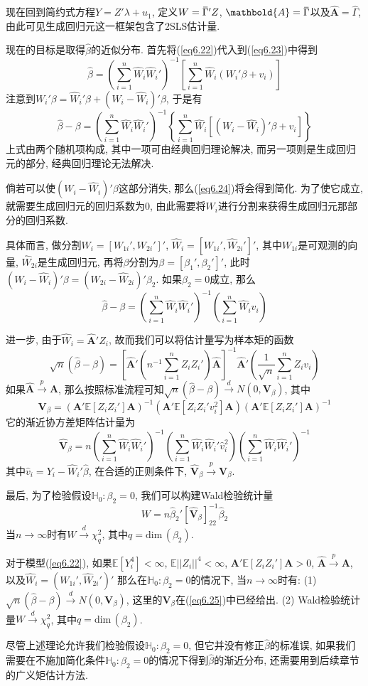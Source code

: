 \documentclass[cn, 12pt, math=mtpro2, bibstyle=apa, blue, twocol]{elegantbook}
\newcommand{\E}{\mathbb{E}}
\newcommand{\hb}{\hat{\beta}}
\newcommand{\HH}{\mathbb{H}}
\newcommand{\V}{\mathbold{V}}
\newcommand{\A}{\mathbold{A}}
\newcommand{\overbar}[1]{\mkern 1.5mu\overline{\mkern-1.5mu#1\mkern-1.5mu}\mkern 1.5mu}
\begin{document}
现在回到简约式方程$Y=Z'\lambda+u_1$, 定义$W=\overbar{\Gamma}'Z$, $\mathbold{A}=\overbar{\Gamma}$以及$\hat{\mathbold{A}}=\hat{\Gamma}$, 由此可见生成回归元这一框架包含了2SLS估计量.

现在的目标是取得$\hb$的近似分布. 首先将(\ref{eq6.22})代入到(\ref{eq6.23})中得到
$$\hb=\left(\sum_{i=1}^{n}\hat{W}_i\hat{W}_i'\right)^{-1}\left[\sum_{i=1}^{n}\hat{W}_i(W_i'\beta+v_i)\right]$$
注意到$W_i'\beta=\hat{W}_i'\beta+(W_i-\hat{W}_i)'\beta$, 于是有
\begin{equation}\label{eq6.24}
  \hb-\beta=\left(\sum_{i=1}^{n}\hat{W}_i\hat{W}_i'\right)^{-1}\left\{\sum_{i=1}^{n}\hat{W}_i\left[(W_i-\hat{W}_i)'\beta+v_i\right]\right\}
\end{equation}
上式由两个随机项构成, 其中一项可由经典回归理论解决, 而另一项则是生成回归元的部分, 经典回归理论无法解决.

倘若可以使$(W_i-\hat{W}_i)'\beta$这部分消失, 那么(\ref{eq6.24})将会得到简化. 为了使它成立, 就需要生成回归元的回归系数为0, 由此需要将$W_i$进行分割来获得生成回归元那部分的回归系数.

具体而言, 做分割$W_i=[W_{1i}',W_{2i}']'$, $\hat{W}_i=[W_{1i}',\hat{W}_{2i}']'$, 其中$W_{1i}$是可观测的向量, $\hat{W}_{2i}$是生成回归元, 再将$\beta$分割为$\beta=[\beta_1',\beta_2']'$, 此时$(W_i-\hat{W}_i)'\beta=(W_{2i}-\hat{W}_{2i})'\beta_2$. 如果$\beta_2=0$成立, 那么
$$\hb-\beta=\left(\sum_{i=1}^{n}\hat{W}_i\hat{W}_i'\right)^{-1}\left(\sum_{i=1}^{n}\hat{W}_iv_i\right)$$

进一步, 由于$\hat{W}_i=\hat{\A}'Z_i$, 故而我们可以将估计量写为样本矩的函数
$$\sqrt{n}(\hb-\beta)=\left[\hat{\A}'\left(n^{-1}\sum_{i=1}^{n}Z_iZ_i'\right)\hat{\A}\right]^{-1}\hat{\A}'\left(\frac{1}{\sqrt{n}}\sum_{i=1}^{n}Z_iv_i\right)$$
如果$\hat{\A}\xrightarrow{p}\A$, 那么按照标准流程可知$\sqrt{n}(\hb-\beta)\xrightarrow{d}N(0,\V_\beta)$, 其中
\begin{equation}\label{eq6.25}
  \V_\beta=(\A'\E[Z_iZ_i']\A)^{-1}(\A'\E[Z_iZ_i'v_i^2]\A)(\A'\E[Z_iZ_i']\A)^{-1}
\end{equation}
它的渐近协方差矩阵估计量为
$$\hat{\V}_\beta=n\left(\sum_{i=1}^{n}\hat{W}_i\hat{W}_i'\right)^{-1}\left(\sum_{i=1}^{n}\hat{W}_i\hat{W}_i'\hat{v}_i^2\right)\left(\sum_{i=1}^{n}\hat{W}_i\hat{W}_i'\right)^{-1}$$
其中$\hat{v}_i=Y_i-\hat{W}_i'\hat{\beta}$, 在合适的正则条件下, $\hat{\V}_\beta\xrightarrow{p}\V_\beta$.

最后, 为了检验假设$\HH_0: \beta_2=0$, 我们可以构建Wald检验统计量
$$W=n\hb_2'[\hat{\V}_\beta]_{22}^{-1}\hb_2$$
当$n\to\infty$时有$W\xrightarrow{d}\chi^2_q$, 其中$q=\text{dim}\,(\beta_2)$.
\begin{theorem}\label{thm:thm6.2}
  对于模型(\ref{eq6.22}), 如果$\E[Y_i^4]<\infty$, $\E||Z_i||^4<\infty$, $\A'\E[Z_iZ_i']\A>0$, $\hat{\A}\xrightarrow{p}\A$, 以及$\hat{W}_i=(W_{1i}',\hat{W}_{2i}')'$ 那么在$\HH_0:\beta_2=0$的情况下, 当$n\to\infty$时有: (1) $\sqrt{n}(\hb-\beta)\xrightarrow{d}N(0,\V_\beta)$, 这里的$\V_\beta$在(\ref{eq6.25})中已经给出. (2) Wald检验统计量$W\xrightarrow{d}\chi^2_q$, 其中$q=\text{dim}\,(\beta_2)$.
\end{theorem}
尽管上述理论允许我们检验假设$\HH_0:\beta_2=0$, 但它并没有修正$\hb$的标准误, 如果我们需要在不施加简化条件$\HH_0:\beta_2=0$的情况下得到$\hb$的渐近分布, 还需要用到后续章节的广义矩估计方法.
\end{document}
